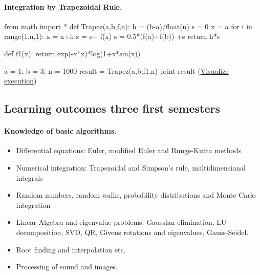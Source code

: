 \documentclass[%
twoside,                 %
final,                   %
10pt]{article}
\begin{document}
\paragraph{Integration by Trapezoidal Rule.}

\bpypro
from math import *
def Trapez(a,b,f,n):
   h = (b-a)/float(n)
   s = 0
   x = a
   for i in range(1,n,1):
       x = x+h
       s = s+ f(x)
   s = 0.5*(f(a)+f(b)) +s
   return h*s

def f1(x):
    return exp(-x*x)*log(1+x*sin(x))

a = 1;  b = 3; n = 1000
result = Trapez(a,b,f1,n)
print result
\epypro
\noindent
(\href{{http://pythontutor.com/visualize.html\#code=from+math+import+\%2A\%0Adef+Trapez\%28a\%2Cb\%2Cf\%2Cn\%29\%3A\%0A+++h+\%3D+\%28b-a\%29\%2Ffloat\%28n\%29\%0A+++s+\%3D+0\%0A+++x+\%3D+a\%0A+++for+i+in+range\%281\%2Cn\%2C1\%29\%3A\%0A+++++++x+\%3D+x\%2Bh\%0A+++++++s+\%3D+s\%2B+f\%28x\%29\%0A+++s+\%3D+0.5\%2A\%28f\%28a\%29\%2Bf\%28b\%29\%29+\%2Bs\%0A+++return+h\%2As\%0A\%0Adef+f1\%28x\%29\%3A\%0A++++return+exp\%28-x\%2Ax\%29\%2Alog\%281\%2Bx\%2Asin\%28x\%29\%29\%0A\%0Aa+\%3D+1\%3B++b+\%3D+3\%3B+n+\%3D+1000\%0Aresult+\%3D+Trapez\%28a\%2Cb\%2Cf1\%2Cn\%29\%0Aprint+result&mode=display&cumulative=false&heapPrimitives=false&drawParentPointers=false&textReferences=false&py=2&curInstr=0}}{Visualize execution})








\subsection{Learning outcomes three first semesters}

\paragraph{Knowledge of basic algorithms.}

\begin{itemize}
\item Differential equations: Euler, modified Euler and Runge-Kutta methods

\item Numerical integration: Trapezoidal and Simpson's rule, multidimensional integrals

\item Random numbers, random walks, probability distributions and Monte Carlo integration

\item Linear Algebra and eigenvalue problems: Gaussian elimination, LU-decomposition, SVD, QR, Givens rotations and eigenvalues, Gauss-Seidel.

\item Root finding and interpolation etc.

\item Processing of sound and images.
\end{itemize}
\end{document}
